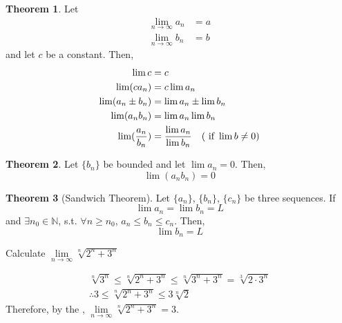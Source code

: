\documentclass[fleqn, a4paper, 8pt, twoside]{amsart}
\theoremstyle{definition}
\theoremstyle{bluedefinition}
\theoremstyle{redtheorem}
\newtheorem{theorem}{Theorem}
\begin{document}
\begin{multicols}{2}
\begin{spacing}{0.7}
\begin{theorem}
	Let
	\begin{align*}
		\lim\limits_{n \to \infty} a_n &= a\\
		\lim\limits_{n \to \infty} b_n &= b
	\end{align*}
	and let $c$ be a constant.
	Then,
	\begin{align*}
		\lim c &= c\\
		\lim (c a_n) &= c \lim a_n\\
		\lim (a_n \pm b_n) &= \lim a_n \pm \lim b_n\\
		\lim (a_n b_n) &= \lim a_n \lim b_n\\
		\lim (\frac{a_n}{b_n}) &= \frac{\lim a_n}{\lim b_n} \quad (\textnormal{ if } \lim b \neq 0)
	\end{align*}
	\label{limit arithmetic}
\end{theorem}

\begin{theorem}
	Let $\{b_n\}$ be bounded and let $\lim a_n = 0$. Then,
	\begin{equation*}
		\lim (a_n b_n) = 0
	\end{equation*}
\end{theorem}

\begin{theorem}[Sandwich Theorem]
	Let $\{a_n\}$, $\{b_n\}$, $\{c_n\}$ be three sequences. If
	\begin{equation*}
		\lim a_n = \lim b_n = L
	\end{equation*}
	and $\exists n_0 \in \mathbb{N}$, s.t. $\forall n \geq n_0$, $a_n \leq b_n \leq c_n$.
	Then,
	\begin{equation*}
		\lim b_n = L
	\end{equation*}
	\label{sandwich theorem}
\end{theorem}

\begin{question}
	Calculate $\lim\limits_{n \to \infty} \sqrt[n]{2^n + 3^n}$
\end{question}

\begin{solution}[print]
	\begin{gather*}
		\sqrt[n]{3^n} \leq \sqrt[n]{2^n + 3^n} \leq \sqrt[n]{3^n + 3^n} = \sqrt[3]{2 \cdot 3^n}\\
		\therefore 3 \leq \sqrt[n]{2^n + 3^n} \leq 3 \sqrt[n]{2}
	\end{gather*}
	Therefore, by the , $\lim\limits_{n \to \infty} \sqrt[n]{2^n + 3^n} = 3$.
\end{solution}


\end{spacing}
\end{multicols}
\end{document}
